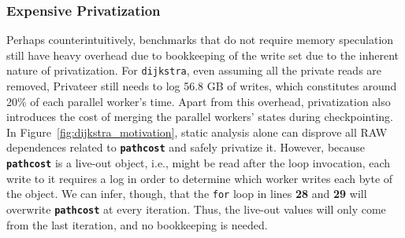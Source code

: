 \subsubsection{Expensive Privatization}
\label{sec:excessive-priv}
Perhaps counterintuitively, benchmarks that do not require memory
speculation still have heavy overhead due to bookkeeping of the write set
due to the inherent nature of privatization. For \texttt{dijkstra}, even
assuming all the private reads are removed, Privateer still needs to log
56.8 GB of writes, which constitutes around 20\% of each parallel worker's
time. Apart from this overhead, privatization also introduces the cost of
merging the parallel workers' states during checkpointing. In
Figure~\ref{fig:dijkstra_motivation}, static analysis alone can disprove
all RAW dependences related to \texttt{\textbf{pathcost}} and safely
privatize it. However, because \texttt{\textbf{pathcost}} is a live-out
object, i.e., might be read after the loop invocation, each write to it
requires a log in order to determine which worker writes each byte of the
object. We can infer, though, that the \texttt{for} loop in lines
\textbf{28} and \textbf{29} will overwrite \texttt{\textbf{pathcost}} at
every iteration. Thus, the live-out values will only come from the last
iteration, and no bookkeeping is needed.




